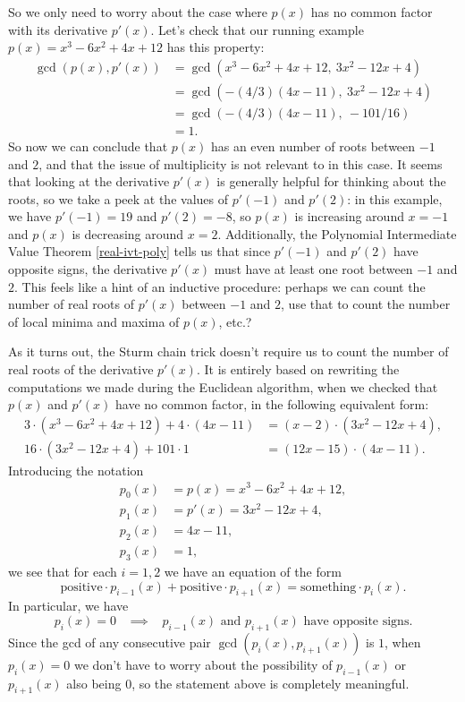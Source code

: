 So we only need to worry about the case where $p(x)$ has no common factor with its derivative $p'(x)$. Let's check that our running example $p(x) = x^3 - 6x^2 + 4x + 12$ has this property:
\begin{align*}
\gcd(p(x), p'(x)) &= \gcd(x^3 - 6x^2 + 4x + 12,\ 3x^2 - 12x + 4)\\
&= \gcd(-(4/3)(4x - 11),\ 3x^2 - 12x + 4)\\
&= \gcd(-(4/3)(4x - 11),\ -101/16)\\
&= 1.
\end{align*}
So now we can conclude that $p(x)$ has an even number of roots between $-1$ and $2$, and that the issue of multiplicity is not relevant to in this case. It seems that looking at the derivative $p'(x)$ is generally helpful for thinking about the roots, so we take a peek at the values of $p'(-1)$ and $p'(2)$: in this example, we have $p'(-1) = 19$ and $p'(2) = -8$, so $p(x)$ is increasing around $x = -1$ and $p(x)$ is decreasing around $x = 2$. Additionally, the Polynomial Intermediate Value Theorem \ref{real-ivt-poly} tells us that since $p'(-1)$ and $p'(2)$ have opposite signs, the derivative $p'(x)$ must have at least one root between $-1$ and $2$. This feels like a hint of an inductive procedure: perhaps we can count the number of real roots of $p'(x)$ between $-1$ and $2$, use that to count the number of local minima and maxima of $p(x)$, etc.?

As it turns out, the Sturm chain trick doesn't require us to count the number of real roots of the derivative $p'(x)$. It is entirely based on rewriting the computations we made during the Euclidean algorithm, when we checked that $p(x)$ and $p'(x)$ have no common factor, in the following equivalent form:
\begin{align*}
3\cdot(x^3 - 6x^2 + 4x + 12) + 4\cdot(4x-11) &= (x-2)\cdot(3x^2 - 12x + 4),\\
16\cdot(3x^2 - 12x + 4) + 101\cdot 1 &= (12x-15)\cdot(4x-11).
\end{align*}
Introducing the notation
\begin{align*}
p_0(x) &= p(x) = x^3 - 6x^2 + 4x + 12,\\
p_1(x) &= p'(x) = 3x^2 - 12x + 4,\\
p_2(x) &= 4x - 11,\\
p_3(x) &= 1,
\end{align*}
we see that for each $i = 1,2$ we have an equation of the form
\[
\text{positive}\cdot p_{i-1}(x) + \text{positive}\cdot p_{i+1}(x) = \text{something}\cdot p_i(x).
\]
In particular, we have
\[
p_i(x) = 0 \;\;\; \implies \;\;\; p_{i-1}(x) \text{ and } p_{i+1}(x) \text{ have opposite signs.}
\]
Since the gcd of any consecutive pair $\gcd(p_i(x), p_{i+1}(x))$ is $1$, when $p_i(x) = 0$ we don't have to worry about the possibility of $p_{i-1}(x)$ or $p_{i+1}(x)$ also being $0$, so the statement above is completely meaningful.


